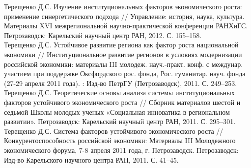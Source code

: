\documentclass[10pt]{article}
\newcommand{\years}[1]{\marginnote{\scriptsize #1}}
\begin{document}
\years{2012}Терещенко Д.С. Изучение институциональных факторов экономического роста: применение синергетического подхода // Управление: история, наука, культура. Материалы XVI межрегиональной научно-практической конференции РАНХиГС. Петрозаводск: Карельский научный центр РАН, 2012. С. 155–158.\\
\years{2011}Терещенко Д.С. Устойчивое развитие региона как фактор роста национальной экономики // Институциональное развитие регионов в условиях модернизации российской экономики: материалы III молодеж. науч.-практ. конф. с междунар. участием при поддержке Оксфордского рос. фонда, Рос. гуманитар. науч. фонда (27-29 апреля 2011 года). : Изд-во ПетрГУ (Петрозаводск), 2011. С. 249–253.\\
\years{2011}Терещенко Д.С. Теоретические основы анализа системы институциональных факторов устойчивого экономического роста // Сборник материалов шестой и седьмой Школы молодых ученых «Социальная инноватика в региональном развитии». Петрозаводск: Карельский научный центр РАН, 2011. С. 295–301.\\
\years{2011}Терещенко Д.С. Система факторов устойчивого экономического роста // Конкурентоспособность российской экономики: Материалы III Молодежного экономического форума, 7-8 апреля 2011 года, г. Петрозаводск. Петрозаводск: Изд-во Карельского научного центра РАН, 2011. С. 41–45.\\
\end{document}
